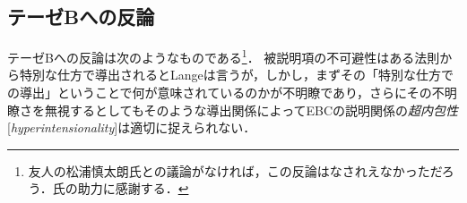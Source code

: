 \documentclass[dvipdfmx,twoside,11pt,uplatex]{jsarticle}
\newcommand{\myterm}[2]{{\emph{#1}}{[\emph{#2}]}}
\theoremstyle{definition}
\begin{document}



\subsection{テーゼBへの反論}\label{objectiontob}
テーゼBへの反論は次のようなものである\footnote{
友人の松浦慎太朗氏との議論がなければ，この反論はなされえなかっただろう．氏の助力に感謝する．
}．
被説明項の不可避性はある法則から特別な仕方で導出されるとLangeは言うが，しかし，まずその「特別な仕方での導出」ということで何が意味されているのかが不明瞭であり，さらにその不明瞭さを無視するとしてもそのような導出関係によってEBCの説明関係の\myterm{超内包性}{hyperintensionality}は適切に捉えられない．
\end{document}
